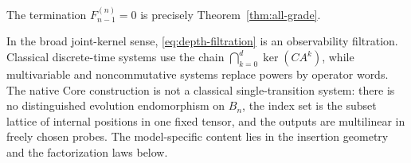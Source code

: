 The termination $F_{n-1}^{(n)}=0$ is precisely Theorem~\ref{thm:all-grade}.

In the broad joint-kernel sense, \eqref{eq:depth-filtration} is an observability filtration.  Classical discrete-time systems use the chain $\bigcap_{k=0}^d\ker(CA^k)$, while multivariable and noncommutative systems replace powers by operator words.  The native Core construction is not a classical single-transition system: there is no distinguished evolution endomorphism on $B_n$, the index set is the subset lattice of internal positions in one fixed tensor, and the outputs are multilinear in freely chosen probes.  The model-specific content lies in the insertion geometry and the factorization laws below.
